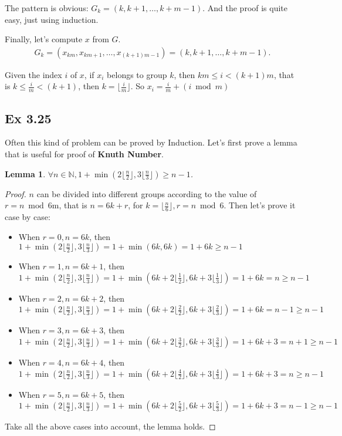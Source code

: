 \documentclass{article}
\newtheorem{lemma}[theorem]{Lemma}
\begin{document}
The pattern is obvious: $G_k = (k, k+1, \dots, k+m-1)$. And the proof is quite easy, just using induction.

Finally, let's compute $x$ from $G$. 
\begin{equation}
    \begin{split}
        G_k = (x_{km}, x_{km+1}, \dots, x_{(k+1)m-1}) = (k, k+1, \dots, k+m-1).
    \end{split}
\end{equation}
 
Given the index $i$ of $x$, if $x_i$ belongs to group $k$, then $km \le i < (k+1)m$, that is $k \le \frac{i}{m} < (k+1)$, then $k = \lfloor \frac{i}{m} \rfloor$. So $x_i = \frac{i}{m} + (i \bmod m)$

\subsection{Ex 3.25}

Often this kind of problem can be proved by Induction. Let's first prove a lemma that is useful for proof of \textbf{Knuth Number}.

\begin{lemma}
$\forall n \in \mathbb{N}, 1 + \min(2\lfloor \frac{n}{2} \rfloor, 3\lfloor \frac{n}{3} \rfloor) \ge n - 1$.
\end{lemma}

\begin{proof}
$n$ can be divided into different groups according to the value of $r = n \bmod 6$m, that is $n = 6k + r$, for $k=\lfloor \frac{n}{6} \rfloor, r = n \bmod 6$. Then let's prove it case by case:
\begin{itemize}
    \item When $r=0, n=6k$, then $1 + \min(2\lfloor \frac{n}{2} \rfloor, 3\lfloor \frac{n}{3} \rfloor) = 1 + \min(6k, 6k) = 1 + 6k \ge n - 1$
    \item When $r=1, n=6k+1$, then $1 + \min(2\lfloor \frac{n}{2} \rfloor, 3\lfloor \frac{n}{3} \rfloor) = 1 + \min(6k + 2\lfloor \frac{1}{2} \rfloor, 6k + 3\lfloor \frac{1}{3} \rfloor) = 1 + 6k = n \ge n - 1$
    \item When $r=2, n=6k+2$, then $1 + \min(2\lfloor \frac{n}{2} \rfloor, 3\lfloor \frac{n}{3} \rfloor) = 1 + \min(6k+2\lfloor \frac{2}{2} \rfloor, 6k+3\lfloor \frac{2}{3} \rfloor) = 1 + 6k = n - 1 \ge n - 1$
    \item When $r=3, n=6k+3$, then $1 + \min(2\lfloor \frac{n}{2} \rfloor, 3\lfloor \frac{n}{3} \rfloor) = 1 + \min(6k+2\lfloor \frac{3}{2} \rfloor, 6k+3\lfloor \frac{3}{3} \rfloor) = 1 + 6k + 3 = n + 1 \ge n - 1$
    \item When $r=4, n=6k+4$, then $1 + \min(2\lfloor \frac{n}{2} \rfloor, 3\lfloor \frac{n}{3} \rfloor) = 1 + \min(6k+2\lfloor \frac{4}{2} \rfloor, 6k+3\lfloor \frac{4}{3} \rfloor) = 1 + 6k + 3= n \ge n - 1$
    \item When $r=5, n=6k+5$, then $1 + \min(2\lfloor \frac{n}{2} \rfloor, 3\lfloor \frac{n}{3} \rfloor) = 1 + \min(6k+2\lfloor \frac{5}{2} \rfloor, 6k+3\lfloor \frac{5}{3} \rfloor) = 1 + 6k + 3 = n - 1 \ge n - 1$
\end{itemize}
Take all the above cases into account, the lemma holds.
\end{proof}
\end{document}
